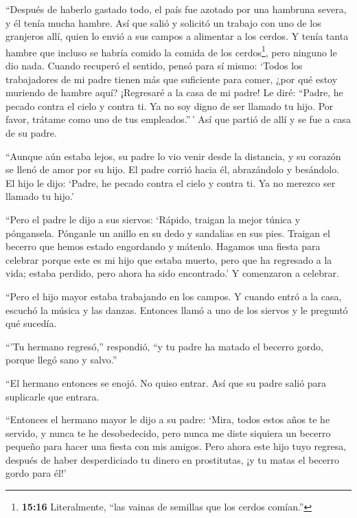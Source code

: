  ``Después de haberlo gastado todo, el país fue azotado por
una hambruna severa, y él tenía mucha hambre.  Así que
salió y solicitó un trabajo con uno de los granjeros allí, quien lo
envió a sus campos a alimentar a los cerdos.  Y tenía tanta
hambre que incluso se habría comido la comida de los cerdos\footnote{\textbf{15:16}
  Literalmente, ``las vainas de semillas que los cerdos comían.''}, pero
ninguno le dio nada.  Cuando recuperó el sentido, pensó
para sí mismo: `Todos los trabajadores de mi padre tienen más que
suficiente para comer, ¿por qué estoy muriendo de hambre aquí?
 ¡Regresaré a la casa de mi padre! Le diré: ``Padre, he
pecado contra el cielo y contra ti.  Ya no soy digno de ser
llamado tu hijo. Por favor, trátame como uno de tus empleados.''\,'
 Así que partió de allí y se fue a casa de su padre.

``Aunque aún estaba lejos, su padre lo vio venir desde la distancia, y
su corazón se llenó de amor por su hijo. El padre corrió hacia él,
abrazándolo y besándolo.  El hijo le dijo: `Padre, he
pecado contra el cielo y contra ti. Ya no merezco ser llamado tu hijo.'

 ``Pero el padre le dijo a sus siervos: `Rápido, traigan la
mejor túnica y póngansela. Pónganle un anillo en su dedo y sandalias en
sus pies.  Traigan el becerro que hemos estado engordando y
mátenlo. Hagamos una fiesta para celebrar  porque este es
mi hijo que estaba muerto, pero que ha regresado a la vida; estaba
perdido, pero ahora ha sido encontrado.' Y comenzaron a celebrar.

 ``Pero el hijo mayor estaba trabajando en los campos. Y
cuando entró a la casa, escuchó la música y las danzas. 
Entonces llamó a uno de los siervos y le preguntó qué sucedía.

 ``'Tu hermano regresó,'' respondió, ``y tu padre ha matado
el becerro gordo, porque llegó sano y salvo.''

 ``El hermano entonces se enojó. No quiso entrar. Así que
su padre salió para suplicarle que entrara.

 ``Entonces el hermano mayor le dijo a su padre: `Mira,
todos estos años te he servido, y nunca te he desobedecido, pero nunca
me diste siquiera un becerro pequeño para hacer una fiesta con mis
amigos.  Pero ahora este hijo tuyo regresa, después de
haber desperdiciado tu dinero en prostitutas, ¡y tu matas el becerro
gordo para él!'


